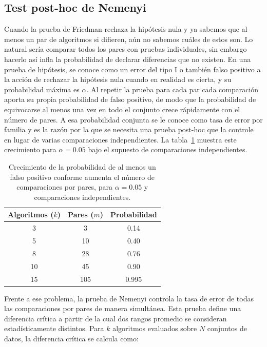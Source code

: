 \subsection{Test post-hoc de Nemenyi}

Cuando la prueba de Friedman rechaza la hipótesis nula y ya sabemos que al menos un par de algoritmos si difieren, aún no sabemos cuáles de estos son. Lo natural sería comparar todos los pares con pruebas individuales, sin embargo hacerlo así infla la probabilidad de declarar diferencias que no existen. En una prueba de hipótesis, se conoce como un error del tipo I o también falso positivo a la acción de rechazar la hipótesis nula cuando en realidad es cierta, y su probabilidad máxima es $\alpha$. Al repetir la prueba para cada par cada comparación aporta su propia probabilidad de falso positivo, de modo que la probabilidad de equivocarse al menos una vez en todo el conjunto crece rápidamente con el número de pares. A esa probabilidad conjunta se le conoce como tasa de error por familia y es la razón por la que se necesita una prueba post-hoc que la controle en lugar de varias comparaciones independientes. La tabla~\ref{tab:fwer} muestra este crecimiento para $\alpha=0.05$ bajo el supuesto de comparaciones independientes.\\[.15cm]

\begin{table}[H]
\centering
\small
\caption{Crecimiento de la probabilidad de al menos un falso positivo conforme aumenta el número de comparaciones por pares, para $\alpha = 0.05$ y comparaciones independientes.}
\label{tab:fwer}
\begin{tabular}{c c c}
\toprule
\textbf{Algoritmos} ($k$) & \textbf{Pares} ($m$) & \textbf{Probabilidad} \\
\midrule
3 & 3 & 0.14 \\
5 & 10 & 0.40 \\
8 & 28 & 0.76 \\
10 & 45 & 0.90 \\
15 & 105 & 0.995 \\
\bottomrule
\end{tabular}
\end{table}

Frente a ese problema, la prueba de Nemenyi controla la tasa de error de todas las comparaciones por pares de manera simultánea. Esta prueba define una diferencia crítica a partir de la cual dos rangos promedio se consideran estadísticamente distintos. Para $k$ algoritmos evaluados sobre $N$ conjuntos de datos, la diferencia crítica se calcula como:

